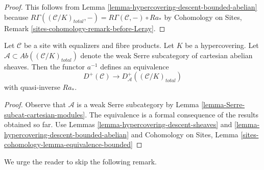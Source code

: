 \begin{proof}
This follows from Lemma \ref{lemma-hypercovering-descent-bounded-abelian}
because $R\Gamma((\mathcal{C}/K)_{total}, -) =
R\Gamma(\mathcal{C}, -) \circ Ra_*$ by
Cohomology on Sites, Remark \ref{sites-cohomology-remark-before-Leray}.
\end{proof}

\begin{lemma}
\label{lemma-hypercovering-equivalence-bounded}
Let $\mathcal{C}$ be a site with equalizers and fibre products.
Let $K$ be a hypercovering.
Let $\mathcal{A} \subset \textit{Ab}((\mathcal{C}/K)_{total})$
denote the weak Serre subcategory of cartesian abelian sheaves.
Then the functor $a^{-1}$ defines an equivalence
$$
D^+(\mathcal{C}) \longrightarrow D_\mathcal{A}^+((\mathcal{C}/K)_{total})
$$
with quasi-inverse $Ra_*$.
\end{lemma}

\begin{proof}
Observe that $\mathcal{A}$ is a weak Serre subcategory by
Lemma \ref{lemma-Serre-subcat-cartesian-modules}.
The equivalence is a
formal consequence of the results obtained so far. Use
Lemmas \ref{lemma-hypercovering-descent-sheaves} and
\ref{lemma-hypercovering-descent-bounded-abelian} and
Cohomology on Sites, Lemma \ref{sites-cohomology-lemma-equivalence-bounded}
\end{proof}

\noindent
We urge the reader to skip the following remark.


